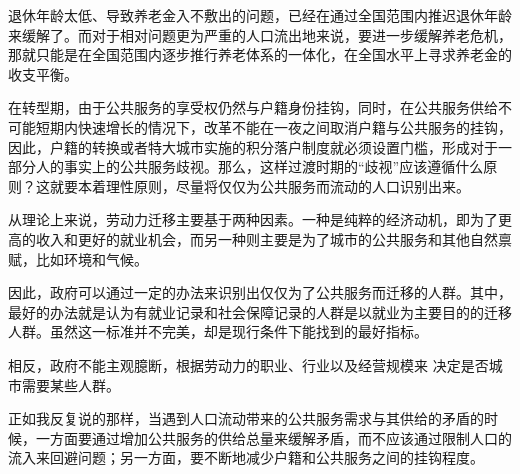 退休年龄太低、导致养老金入不敷出的问题，已经在通过全国范围内推迟退休年龄来缓解了。而对于相对问题更为严重的人口流出地来说，要进一步缓解养老危机，那就只能是在全国范围内逐步推行养老体系的一体化，在全国水平上寻求养老金的收支平衡。

在转型期，由于公共服务的享受权仍然与户籍身份挂钩，同时，在公共服务供给不可能短期内快速增长的情况下，改革不能在一夜之间取消户籍与公共服务的挂钩，因此，户籍的转换或者特大城市实施的积分落户制度就必须设置门槛，形成对于一部分人的事实上的公共服务歧视。那么，这样过渡时期的“歧视”应该遵循什么原则？这就要本着理性原则，尽量将仅仅为公共服务而流动的人口识别出来。

从理论上来说，劳动力迁移主要基于两种因素。一种是纯粹的经济动机，即为了更高的收入和更好的就业机会，而另一种则主要是为了城市的公共服务和其他自然禀赋，比如环境和气候。

因此，政府可以通过一定的办法来识别出仅仅为了公共服务而迁移的人群。其中，最好的办法就是认为有就业记录和社会保障记录的人群是以就业为主要目的的迁移人群。虽然这一标准并不完美，却是现行条件下能找到的最好指标。

相反，政府不能主观臆断，根据劳动力的职业、行业以及经营规模来 决定是否城市需要某些人群。


正如我反复说的那样，当遇到人口流动带来的公共服务需求与其供给的矛盾的时候，一方面要通过增加公共服务的供给总量来缓解矛盾，而不应该通过限制人口的流入来回避问题；另一方面，要不断地减少户籍和公共服务之间的挂钩程度。
